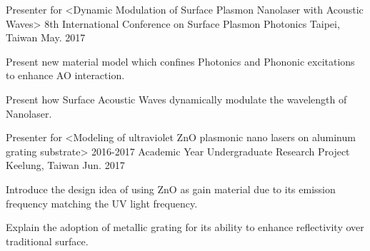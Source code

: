 

\begin{cventries}

  \cventry
    {Presenter for <Dynamic Modulation of Surface Plasmon Nanolaser with Acoustic Waves>} %
    {8th International Conference on Surface Plasmon Photonics} %
    {Taipei, Taiwan} %
    {May. 2017} %
    {
      \begin{cvitems} %
        \item {Present new material model which confines Photonics and Phononic excitations to enhance AO interaction.}
        \item {Present how Surface Acoustic Waves dynamically modulate the wavelength of Nanolaser.}
      \end{cvitems}
    }

  \cventry
    {Presenter for <Modeling of ultraviolet ZnO plasmonic nano lasers on aluminum grating substrate>} %
    {2016-2017 Academic Year Undergraduate Research Project} %
    {Keelung, Taiwan} %
    {Jun. 2017} %
    {
      \begin{cvitems} %
        \item {Introduce the design idea of using ZnO as gain material due to its emission frequency matching the UV light frequency.}
        \item {Explain the adoption of metallic grating for its ability to enhance reflectivity over traditional surface.}
      \end{cvitems}
    }

\end{cventries}
